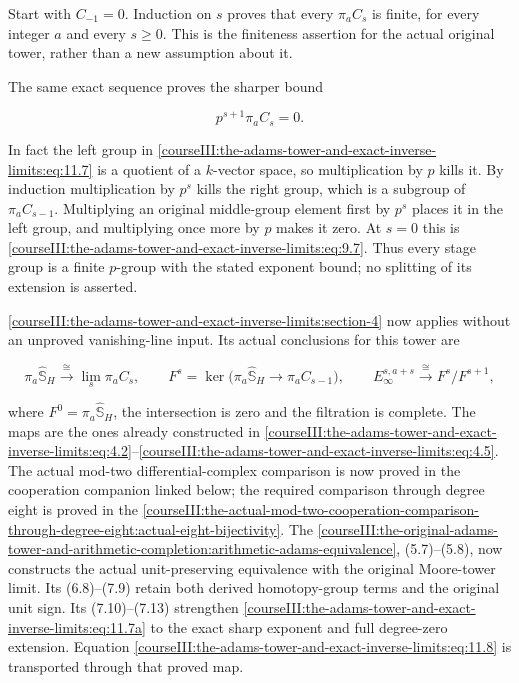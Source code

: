 Start with \(C_{-1}=0\). Induction on \(s\) proves that every \(\pi_aC_s\) is finite, for every integer \(a\) and every \(s\geq0\). This is the finiteness assertion for the actual original tower, rather than a new assumption about it.

The same exact sequence proves the sharper bound

\begin{equation}
p^{s+1}\pi_aC_s=0.
 \label{courseIII:the-adams-tower-and-exact-inverse-limits:eq:11.7a}
\end{equation}

In fact the left group in \eqref{courseIII:the-adams-tower-and-exact-inverse-limits:eq:11.7} is a quotient of a \(k\)-vector space, so multiplication by \(p\) kills it. By induction multiplication by \(p^s\) kills the right group, which is a subgroup of \(\pi_aC_{s-1}\). Multiplying an original middle-group element first by \(p^s\) places it in the left group, and multiplying once more by \(p\) makes it zero. At \(s=0\) this is \eqref{courseIII:the-adams-tower-and-exact-inverse-limits:eq:9.7}. Thus every stage group is a finite \(p\)-group with the stated exponent bound; no splitting of its extension is asserted.

\cref{courseIII:the-adams-tower-and-exact-inverse-limits:section-4} now applies without an unproved vanishing-line input. Its actual conclusions for this tower are

\begin{equation}
\pi_a\widehat{\mathbb S}_H
  \xrightarrow{\cong}\lim_s\pi_aC_s,\qquad
 F^s=\ker\bigl(\pi_a\widehat{\mathbb S}_H\to\pi_aC_{s-1}\bigr),
 \qquad
 E_\infty^{s,a+s}\xrightarrow{\cong}F^s/F^{s+1},
 \label{courseIII:the-adams-tower-and-exact-inverse-limits:eq:11.8}
\end{equation}

where \(F^0=\pi_a\widehat{\mathbb S}_H\), the intersection is zero and the filtration is complete. The maps are the ones already constructed in \eqref{courseIII:the-adams-tower-and-exact-inverse-limits:eq:4.2}--\eqref{courseIII:the-adams-tower-and-exact-inverse-limits:eq:4.5}. The actual mod-two differential-complex comparison is now proved in the cooperation companion linked below; the required comparison through degree eight is proved in the \cref{courseIII:the-actual-mod-two-cooperation-comparison-through-degree-eight:actual-eight-bijectivity}. The \cref{courseIII:the-original-adams-tower-and-arithmetic-completion:arithmetic-adams-equivalence}, (5.7)--(5.8), now constructs the actual unit-preserving equivalence with the original Moore-tower limit. Its (6.8)--(7.9) retain both derived homotopy-group terms and the original unit sign. Its (7.10)--(7.13) strengthen \eqref{courseIII:the-adams-tower-and-exact-inverse-limits:eq:11.7a} to the exact sharp exponent and full degree-zero extension. Equation \eqref{courseIII:the-adams-tower-and-exact-inverse-limits:eq:11.8} is transported through that proved map.


